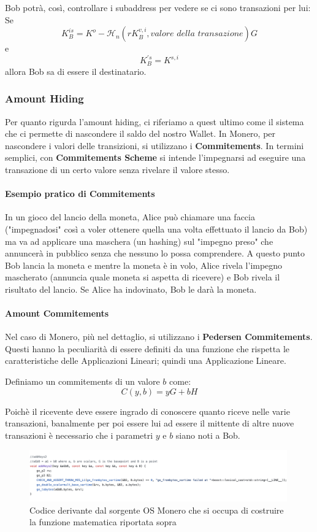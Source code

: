 \documentclass[12pt,a4paper]{article}
\begin{document}
Bob potrà, così, controllare i subaddress per vedere se ci sono transazioni per
lui: Se 
$$ K^{is}_B = K^o - \mathcal{H}_n(rK^{v,i}_B, \textit{valore della
transazione})G $$ e $$ K^{'s}_B = K^{s,i} $$ allora Bob sa di essere il
destinatario.

\subsubsection*{Amount Hiding}
Per quanto rigurda l'amount hiding, ci riferiamo a quest ultimo come il sistema
che ci permette di nascondere il saldo del nostro Wallet. In Monero, per nascondere i valori delle transizioni, si utilizzano i \textbf{Commitements}. 
In termini semplici, con \textbf{Commitements Scheme} si intende l'impegnarsi 
ad eseguire una transazione di un certo valore senza rivelare il valore stesso.

\paragraph{Esempio pratico di Commitements}

In un gioco del lancio della moneta, Alice può chiamare una faccia
("impegnadosi" così a voler ottenere quella una volta effettuato il lancio da Bob) ma va ad applicare una maschera (un hashing) sul "impegno preso" che annuncerà in pubblico senza che nessuno lo possa comprendere. A questo punto Bob lancia la moneta e mentre la moneta è in volo, Alice rivela l'impegno mascherato (annuncia quale moneta si aspetta di ricevere) e Bob rivela il risultato del lancio. Se Alice ha indovinato, Bob le darà la moneta.

\paragraph{Amount Commitements} Nel caso di Monero, più nel dettaglio, si utilizzano i \textbf{Pedersen Commitements}. Questi hanno la peculiarità di essere definiti da una funzione che rispetta le caratteristiche delle Applicazioni Lineari; quindi una Applicazione Lineare.

Definiamo un commitements di un valore $ b $ come:
$$ C(y, b) = yG + bH $$

Poichè il ricevente deve essere ingrado di conoscere quanto riceve nelle varie transazioni, banalmente per poi essere lui ad essere il mittente di altre nuove transazioni è necessario che i parametri $ y $ e $ b $ siano noti a Bob. 

\begin{figure}[ht]
    \centering
    \includegraphics[width=0.99\textwidth]{./images/addKeys2.png}
    \caption{Codice derivante dal sorgente OS Monero che si occupa di costruire la funzione matematica riportata sopra}
    \label{fig:summary}
\end{figure}
\end{document}
